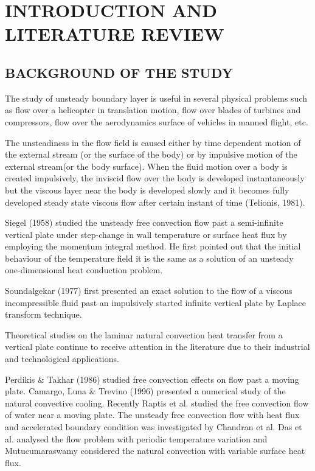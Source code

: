 \documentclass[11pt]{report}
\begin{document}
	\tableofcontents
	\newpage
	
	\chapter{INTRODUCTION AND LITERATURE REVIEW}
	
	\section{BACKGROUND OF THE STUDY}
	The study of unsteady boundary layer is useful in several physical problems such as flow over a helicopter in translation motion, flow over blades of turbines and compressors, flow over the aerodynamics surface of vehicles in manned flight, etc.
	
	The unsteadiness in the flow field is caused either by time dependent motion of the external stream (or the surface of the body) or by impulsive motion of the external stream(or the body surface). When the fluid motion over a body is created impulsively, the inviscid flow over the body is developed instantaneously but the viscous layer near the body is developed slowly and it becomes fully developed steady state viscous flow after certain instant of time (Telionis, 1981).
	
	Siegel (1958) studied the unsteady free convection flow past a semi-infinite vertical plate under step-change in wall temperature or surface heat flux by employing the momentum integral method. He first pointed out that the initial behaviour of the temperature field it is the same as a solution of an unsteady one-dimensional heat conduction problem.
	
	Soundalgekar (1977) first presented an exact solution to the flow of a viscous incompressible fluid past an impulsively started infinite vertical plate by Laplace transform technique.
	
	Theoretical studies on the laminar natural convection heat transfer from a vertical plate continue to receive attention in the literature due to their industrial and technological applications.
	
	Perdikis \& Takhar (1986) studied free convection effects on flow past a moving plate. Camargo, Luna \& Trevino (1996) presented a numerical study of the natural convective cooling. Recently Raptis et al. studied the free convection flow of water near a moving plate. The unsteady free convection flow with heat flux and accelerated boundary condition was investigated by Chandran et al. Das et al. analysed the flow problem with periodic temperature variation and Mutucumaraswamy considered the natural convection with variable surface heat flux.
	
\end{document}
